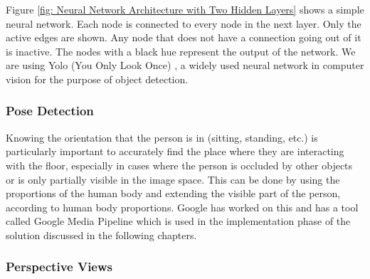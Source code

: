 \documentclass[12pt]{report}
\begin{document}
Figure \ref{fig: Neural Network Architecture with Two Hidden Layers} shows a simple neural network. Each node is connected to every node in the next layer. Only the active edges are shown.
Any node that does not have a connection going out of it is inactive. The nodes with a black hue represent the output of the network. We are using Yolo (You Only Look Once) \cite{11}, a widely used neural network in computer vision for the purpose of object detection.\newline

\subsubsection{Pose Detection}

Knowing the orientation that the person is in (sitting, standing, etc.) is particularly important to accurately find the place where they are interacting with the floor, especially in cases where the person is occluded by other objects or is only partially visible in the image space. This can be done by using the proportions of the human body and extending the visible part of the person, according to human body proportions. Google has worked on this and has a tool called Google Media Pipeline \cite{12} which is used in the implementation phase of the solution discussed in the following chapters. 

\subsubsection{Perspective Views}
\end{document}
